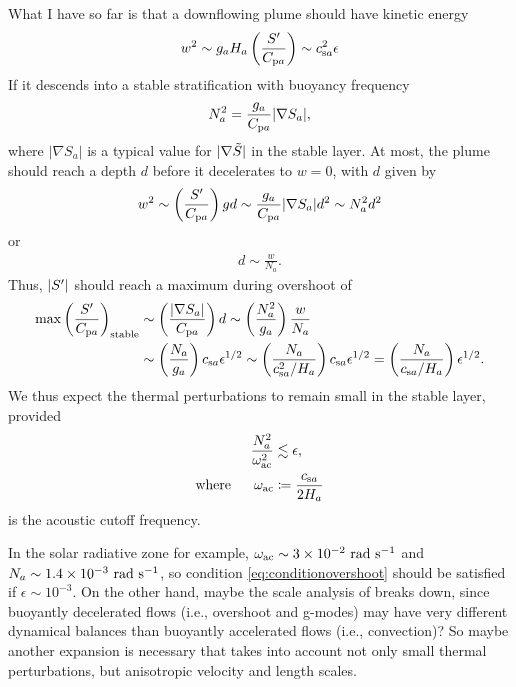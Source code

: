 \documentclass[12pt]{article}
\newcommand{\csa}{c_{{\rm s}a}}
\newcommand{\cpa}{C_{{\rm p}a}}
\begin{document}
What I have so far is that a downflowing plume should have kinetic energy 
\begin{align}
	w^2 \sim g_a H_a \left(\frac{\entrprime}{\cpa}\right) \sim \csa^2 \epsilon
\end{align}
If it descends into a stable stratification with buoyancy frequency
\begin{align}
	N_a^2 =   \frac{g_a}{\cpa}|\nabla S_a|,
\end{align}
where $|\nabla S_a|$ is a typical value for $|\nabla\tilde{S}|$ in the stable layer. At most, the plume should reach a depth $d$ before it decelerates to $w=0$, with $d$ given by
\begin{align}
	w^2 \sim \left(\frac{\entrprime}{\cpa}\right)gd \sim \frac{g_a}{\cpa}|\nabla S_a| d^2 \sim N_a^2 d^2
\end{align}
or 
\begin{align}
	d\sim \frac{w}{N_a}. 
\end{align}
Thus, $|{S^\prime}|$ should reach a maximum during overshoot of 
\begin{align}
	\max{\left(\frac{\entrprime}{\cpa}\right)_{\rm stable}} &\sim \left(\frac{|\nabla S_a|}{\cpa}\right)d \sim \left(\frac{N_a^2}{g_a}\right)\frac{w}{N_a}\nonumber\\
	&\sim \left(\frac{N_a}{g_a}\right)\csa \epsilon^{1/2}\sim \left(\frac{N_a}{\csa^2/H_a}\right)\csa \epsilon^{1/2} = \left(\frac{N_a}{\csa/H_a}\right)\epsilon^{1/2}.
\end{align}
We thus expect the thermal perturbations to remain small in the stable layer, provided 
\begin{subequations}
\begin{align}
	\frac{N_a^2}{\omega_{\rm ac}^2} &\lesssim \epsilon,\label{eq:conditionovershoot}\\
	\where \omega_{\rm ac} &\define \frac{\csa}{2H_a}
\end{align}
\end{subequations}
is the acoustic cutoff frequency. 

In the solar radiative zone for example, $\omega_{\rm ac}\sim\sn{3}{-2}\ \rm rad\ s^{-1}$ and $N_a\sim 1.4\times10^{-3}\ \rm rad\ s^{-1}$, so condition \eqref{eq:conditionovershoot} should be satisfied if $\epsilon \sim 10^{-3}$. On the other hand, maybe the scale analysis of \citet{Gough1969} breaks down, since buoyantly decelerated flows (i.e., overshoot and g-modes) may have very different dynamical balances than buoyantly accelerated flows (i.e., convection)? So maybe another expansion is necessary that takes into account not only small thermal perturbations, but anisotropic velocity and length scales. 
\end{document}
